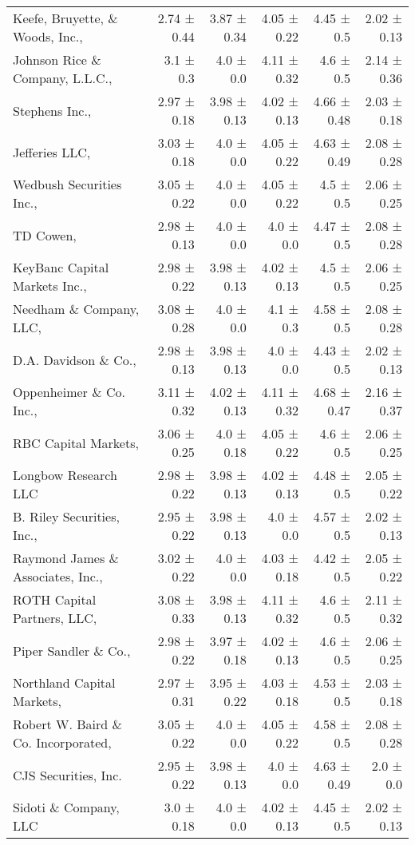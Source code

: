 \begin{tabular}{lrrrrr}
Keefe, Bruyette, \& Woods, Inc.,  & 2.74 ± 0.44 & 3.87 ± 0.34 & 4.05 ± 0.22 & 4.45 ± 0.5 & 2.02 ± 0.13 \\
Johnson Rice \& Company, L.L.C.,  & 3.1 ± 0.3 & 4.0 ± 0.0 & 4.11 ± 0.32 & 4.6 ± 0.5 & 2.14 ± 0.36 \\
Stephens Inc.,  & 2.97 ± 0.18 & 3.98 ± 0.13 & 4.02 ± 0.13 & 4.66 ± 0.48 & 2.03 ± 0.18 \\
Jefferies LLC,  & 3.03 ± 0.18 & 4.0 ± 0.0 & 4.05 ± 0.22 & 4.63 ± 0.49 & 2.08 ± 0.28 \\
Wedbush Securities Inc.,  & 3.05 ± 0.22 & 4.0 ± 0.0 & 4.05 ± 0.22 & 4.5 ± 0.5 & 2.06 ± 0.25 \\
TD Cowen,  & 2.98 ± 0.13 & 4.0 ± 0.0 & 4.0 ± 0.0 & 4.47 ± 0.5 & 2.08 ± 0.28 \\
KeyBanc Capital Markets Inc.,  & 2.98 ± 0.22 & 3.98 ± 0.13 & 4.02 ± 0.13 & 4.5 ± 0.5 & 2.06 ± 0.25 \\
Needham \& Company, LLC,  & 3.08 ± 0.28 & 4.0 ± 0.0 & 4.1 ± 0.3 & 4.58 ± 0.5 & 2.08 ± 0.28 \\
D.A. Davidson \& Co.,  & 2.98 ± 0.13 & 3.98 ± 0.13 & 4.0 ± 0.0 & 4.43 ± 0.5 & 2.02 ± 0.13 \\
Oppenheimer \& Co. Inc.,  & 3.11 ± 0.32 & 4.02 ± 0.13 & 4.11 ± 0.32 & 4.68 ± 0.47 & 2.16 ± 0.37 \\
RBC Capital Markets,  & 3.06 ± 0.25 & 4.0 ± 0.18 & 4.05 ± 0.22 & 4.6 ± 0.5 & 2.06 ± 0.25 \\
Longbow Research LLC & 2.98 ± 0.22 & 3.98 ± 0.13 & 4.02 ± 0.13 & 4.48 ± 0.5 & 2.05 ± 0.22 \\
B. Riley Securities, Inc.,  & 2.95 ± 0.22 & 3.98 ± 0.13 & 4.0 ± 0.0 & 4.57 ± 0.5 & 2.02 ± 0.13 \\
Raymond James \& Associates, Inc.,  & 3.02 ± 0.22 & 4.0 ± 0.0 & 4.03 ± 0.18 & 4.42 ± 0.5 & 2.05 ± 0.22 \\
ROTH Capital Partners, LLC,  & 3.08 ± 0.33 & 3.98 ± 0.13 & 4.11 ± 0.32 & 4.6 ± 0.5 & 2.11 ± 0.32 \\
Piper Sandler \& Co.,  & 2.98 ± 0.22 & 3.97 ± 0.18 & 4.02 ± 0.13 & 4.6 ± 0.5 & 2.06 ± 0.25 \\
Northland Capital Markets,  & 2.97 ± 0.31 & 3.95 ± 0.22 & 4.03 ± 0.18 & 4.53 ± 0.5 & 2.03 ± 0.18 \\
Robert W. Baird \& Co. Incorporated,  & 3.05 ± 0.22 & 4.0 ± 0.0 & 4.05 ± 0.22 & 4.58 ± 0.5 & 2.08 ± 0.28 \\
CJS Securities, Inc. & 2.95 ± 0.22 & 3.98 ± 0.13 & 4.0 ± 0.0 & 4.63 ± 0.49 & 2.0 ± 0.0 \\
Sidoti \& Company, LLC & 3.0 ± 0.18 & 4.0 ± 0.0 & 4.02 ± 0.13 & 4.45 ± 0.5 & 2.02 ± 0.13 \\

\end{tabular}
